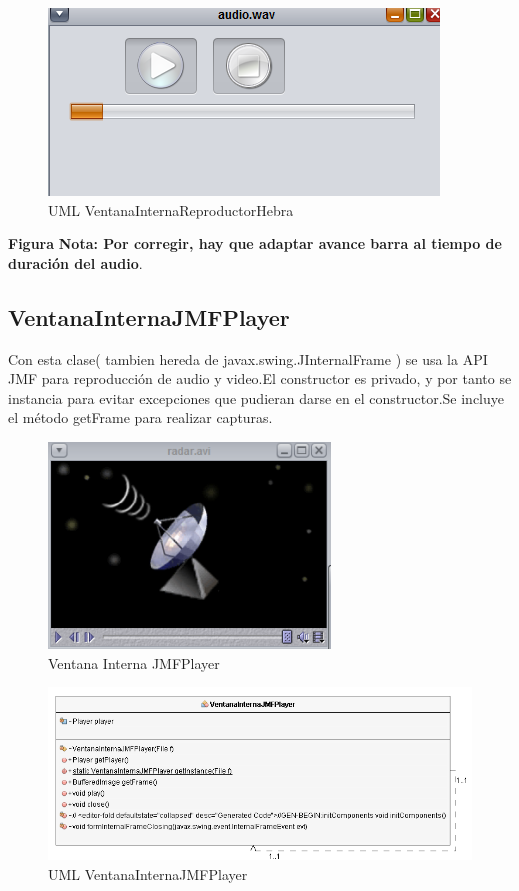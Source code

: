 \begin{figure}[H]
  \centering
    \includegraphics[scale=0.60]{images/VentanaInternaReproductorHebra}
  \caption{UML VentanaInternaReproductorHebra}
  \label{VentanaInternaReproductorHebra}
\end{figure}
\textbf{Figura}
\textbf{Nota: Por corregir, hay que adaptar avance barra al tiempo de duración del audio}.

\subsection{VentanaInternaJMFPlayer}
Con esta clase( tambien hereda de javax.swing.JInternalFrame ) se usa la API JMF para reproducción de audio y video.El constructor es privado, y por tanto se instancia para evitar excepciones que pudieran darse en el constructor.Se incluye el método getFrame para realizar capturas.
\begin{figure}[H]
  \centering
    \includegraphics[scale=0.60]{images/ventanainternajmfp}
  \caption{Ventana Interna JMFPlayer}
  \label{Ventana Interna JMFPlayer}
\end{figure}

\begin{figure}[H]
  \centering
    \includegraphics[scale=0.60]{images/ventanaInternaJMFPlayer}
  \caption{UML VentanaInternaJMFPlayer}
  \label{VentanaInternaJMFPlayer}
\end{figure}

